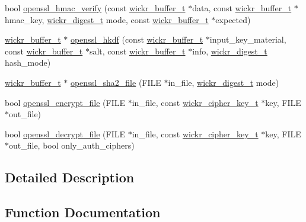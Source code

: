 \begin{DoxyCompactItemize}
bool \mbox{\hyperlink{group__openssl__crypto_gafbde176ef6f2b99ff9dab58ad69a9a74}{openssl\+\_\+hmac\+\_\+verify}} (const \mbox{\hyperlink{structwickr__buffer}{wickr\+\_\+buffer\+\_\+t}} $\ast$data, const \mbox{\hyperlink{structwickr__buffer}{wickr\+\_\+buffer\+\_\+t}} $\ast$hmac\+\_\+key, \mbox{\hyperlink{structwickr__digest}{wickr\+\_\+digest\+\_\+t}} mode, const \mbox{\hyperlink{structwickr__buffer}{wickr\+\_\+buffer\+\_\+t}} $\ast$expected)
\item 
\mbox{\hyperlink{structwickr__buffer}{wickr\+\_\+buffer\+\_\+t}} $\ast$ \mbox{\hyperlink{group__openssl__crypto_ga788a03002d8c6048401cf0bbc2d48c7a}{openssl\+\_\+hkdf}} (const \mbox{\hyperlink{structwickr__buffer}{wickr\+\_\+buffer\+\_\+t}} $\ast$input\+\_\+key\+\_\+material, const \mbox{\hyperlink{structwickr__buffer}{wickr\+\_\+buffer\+\_\+t}} $\ast$salt, const \mbox{\hyperlink{structwickr__buffer}{wickr\+\_\+buffer\+\_\+t}} $\ast$info, \mbox{\hyperlink{structwickr__digest}{wickr\+\_\+digest\+\_\+t}} hash\+\_\+mode)
\item 
\mbox{\hyperlink{structwickr__buffer}{wickr\+\_\+buffer\+\_\+t}} $\ast$ \mbox{\hyperlink{group__openssl__crypto_ga12da75115315fbf7394f4791a2eb815c}{openssl\+\_\+sha2\+\_\+file}} (F\+I\+LE $\ast$in\+\_\+file, \mbox{\hyperlink{structwickr__digest}{wickr\+\_\+digest\+\_\+t}} mode)
\item 
bool \mbox{\hyperlink{group__openssl__crypto_ga178fa1f33ad2767c27411c3ebcdd3ca0}{openssl\+\_\+encrypt\+\_\+file}} (F\+I\+LE $\ast$in\+\_\+file, const \mbox{\hyperlink{structwickr__cipher__key}{wickr\+\_\+cipher\+\_\+key\+\_\+t}} $\ast$key, F\+I\+LE $\ast$out\+\_\+file)
\item 
bool \mbox{\hyperlink{group__openssl__crypto_gaf1faa509e06c188acfbdf43e2197c61a}{openssl\+\_\+decrypt\+\_\+file}} (F\+I\+LE $\ast$in\+\_\+file, const \mbox{\hyperlink{structwickr__cipher__key}{wickr\+\_\+cipher\+\_\+key\+\_\+t}} $\ast$key, F\+I\+LE $\ast$out\+\_\+file, bool only\+\_\+auth\+\_\+ciphers)
\end{DoxyCompactItemize}


\subsection{Detailed Description}


\subsection{Function Documentation}
\mbox{\label{group__openssl__crypto_ga75eaf118b28fb76e75579d0a74517b18}} 
